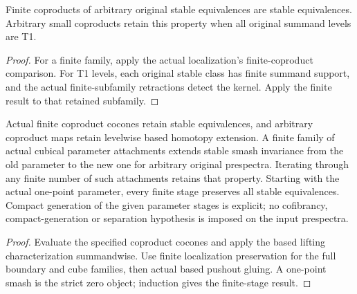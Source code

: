\begin{proposition}
  \label{prop:actual-finite-and-t1-coproduct-stability}
  \leanok
  Finite coproducts of arbitrary original stable equivalences are stable equivalences. Arbitrary small coproducts retain this property when all original summand levels are T1.
\end{proposition}
\begin{proof}
  For a finite family, apply the actual localization's finite-coproduct comparison. For T1 levels, each original stable class has finite summand support, and the actual finite-subfamily retractions detect the kernel. Apply the finite result to that retained subfamily.
  \leanok
\end{proof}

\begin{proposition}
  \label{prop:actual-finite-parameter-cell-flatness}
  \leanok
  Actual finite coproduct cocones retain stable equivalences, and arbitrary coproduct maps retain levelwise based homotopy extension. A finite family of actual cubical parameter attachments extends stable smash invariance from the old parameter to the new one for arbitrary original prespectra. Iterating through any finite number of such attachments retains that property. Starting with the actual one-point parameter, every finite stage preserves all stable equivalences. Compact generation of the given parameter stages is explicit; no cofibrancy, compact-generation or separation hypothesis is imposed on the input prespectra.
\end{proposition}
\begin{proof}
  Evaluate the specified coproduct cocones and apply the based lifting characterization summandwise. Use finite localization preservation for the full boundary and cube families, then actual based pushout gluing. A one-point smash is the strict zero object; induction gives the finite-stage result.
  \leanok
\end{proof}

